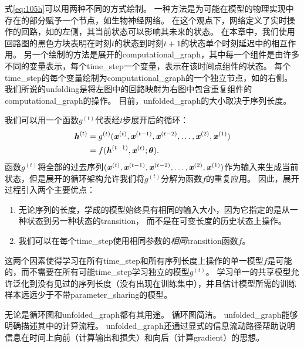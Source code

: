 
式\eqref{eq:105h}可以用两种不同的方式绘制。
一种方法是为可能在模型的物理实现中存在的部分赋予一个节点，如生物神经网络。
在这个观点下，网络定义了实时操作的回路，如的左侧，其当前状态可以影响其未来的状态。
在本章中，我们使用回路图的黑色方块表明在时刻$t$的状态到时刻$t+1$的状态单个时刻延迟中的相互作用。
另一个绘制的方法是展开的\gls{computational_graph}，其中每一个组件是由许多不同的变量表示，每个\gls{time_step}一个变量，表示在该时间点组件的状态。
每个\gls{time_step}的每个变量绘制为\gls{computational_graph}的一个独立节点，如的右侧。
我们所说的\gls{unfolding}是将左图中的回路映射为右图中包含重复组件的\gls{computational_graph}的操作。
目前，\gls{unfolded_graph}的大小取决于序列长度。

我们可以用一个函数$g^{(t)}$代表经$t$步展开后的循环：
\begin{align}
\label{eq:106}
  \boldsymbol{\mathit{h}}^{(t)} &=g^{(t)}(\boldsymbol{\mathit{x}}^{(t)},\boldsymbol{\mathit{x}}^{(t-1)}, \boldsymbol{\mathit{x}}^{(t-2)},\dots,\boldsymbol{\mathit{x}}^{(2)}, \boldsymbol{\mathit{x}}^{(1)}) \\
  & =  f(\boldsymbol{\mathit{h}}^{(t-1)}, \boldsymbol{\mathit{x}}^{(t)} ; \boldsymbol{\theta}) .
\end{align}
函数$g^{(t)}$将全部的过去序列$(\boldsymbol{\mathit{x}}^{(t)},\boldsymbol{\mathit{x}}^{(t-1)}, \boldsymbol{\mathit{x}}^{(t-2)},\dots,\boldsymbol{\mathit{x}}^{(2)}, \boldsymbol{\mathit{x}}^{(1)})$作为输入来生成当前状态，但是展开的循环架构允许我们将$g^{(t)}$分解为函数$f$的重复应用。
因此，展开过程引入两个主要优点：
\begin{enumerate}
 \item 无论序列的长度，学成的模型始终具有相同的输入大小，因为它指定的是从一种状态到另一种状态的\gls{transition}， 而不是在可变长度的历史状态上操作。
 \item 我们可以在每个\gls{time_step}使用相同参数的\emph{相同}\gls{transition}函数$f$。
\end{enumerate}
这两个因素使得学习在所有\gls{time_step}和所有序列长度上操作的单一模型$f$是可能的，而不需要在所有可能\gls{time_step}学习独立的模型$g^{(t)}$。
学习单一的共享模型允许泛化到没有见过的序列长度（没有出现在训练集中），并且估计模型所需的训练样本远远少于不带\gls{parameter_sharing}的模型。


无论是循环图和\gls{unfolded_graph}都有其用途。
循环图简洁。
\gls{unfolded_graph}能够明确描述其中的计算流程。
\gls{unfolded_graph}还通过显式的信息流动路径帮助说明信息在时间上向前（计算输出和损失）和向后（计算\gls{gradient}）的思想。

